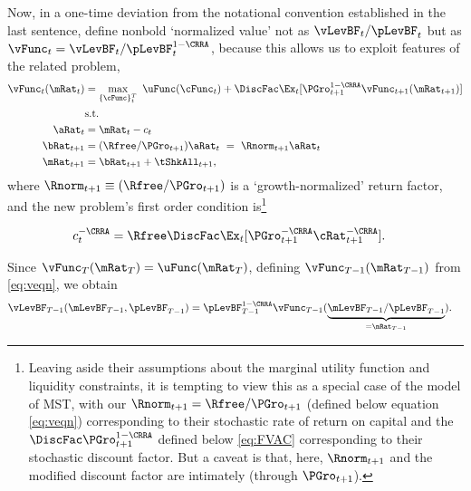 \documentclass[BufferStockTheory]{subfiles}
\begin{document}
\hypertarget{The-Related-Problem}{}
Now, in a one-time deviation from the notational convention established in the last sentence, define nonbold `normalized value' not as $\vLevBF_{t}/\pLevBF_{t}$ but as $\vFunc_{t} = \vLevBF_{t}/\pLevBF_{t}^{1-\CRRA}$, because this allows us to exploit features of the related problem,
\begin{align}
  \vFunc_{t}(\mRat_{t})  & = \max_{\{\cFunc\}_{t}^{T}}~  \uFunc(\cFunc_{t}) +\DiscFac \Ex_{t}[\PGro_{t+1}^{1-\CRRA}\vFunc_{t+1}({\mRat}_{t+1})] \notag \\
                         & \mbox{s.t.}  \label{eq:veqn} 
  \\ {\aRat}_{t}  & = \mRat_{t}-c_{t}  \notag
  \\ {\bRat}_{t+1}  & = (\Rfree/\PGro_{t+1})\aRat_{t}  ~ = ~ \Rnorm_{t+1}\aRat_{t}  \notag
  \\ \mRat_{t+1}  & = \bRat_{t+1}+\tShkAll_{t+1}  \notag, %
\end{align}
where $\Rnorm_{t+1}\equiv (\Rfree/\PGro_{t+1})$ is a `growth-normalized' return factor, and the new problem's first order condition is\footnote{Leaving aside their assumptions about the marginal utility function and liquidity constraints, it is tempting to view this as a special case of the model of MST, with our $\Rnorm_{t+1}=\Rfree/\PGro_{t+1}$ (defined below equation \eqref{eq:veqn}) corresponding to their stochastic rate of return on capital and the {\FVAF} $\DiscFac \PGro_{t+1}^{1-\CRRA}$ defined below \eqref{eq:FVAC} corresponding to their stochastic discount factor.  But a caveat is that, here, $\Rnorm_{t+1}$ and the modified discount factor are intimately (through $\PGro_{t+1}$).}

\begin{align}
  c_{t}^{-\CRRA}  & = \Rfree \DiscFac \Ex_{t}[ {\PGro}_{t+1}^{-\CRRA} {\cRat}
                    _{t+1}^{-\CRRA}].  \label{eq:scaledeuler}
\end{align}

Since $\vFunc_{T}(\mRat_{T}) = \uFunc(\mRat_{T})$, defining $\vFunc_{T-1}(\mRat_{T-1})$ from \eqref{eq:veqn}, we obtain
\begin{align*}
  \vLevBF_{T-1}(\mLevBF_{T-1},\pLevBF_{T-1})  & = \pLevBF_{T-1}^{1-\CRRA} \vFunc_{T-1}(\underbrace{\mLevBF_{T-1}/\pLevBF_{T-1}}_{=\mRat_{T-1}}).
\end{align*}
\end{document}
